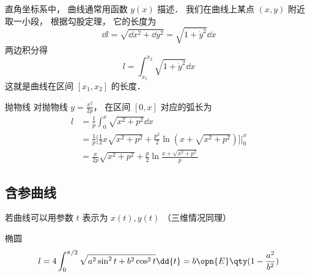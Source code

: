 

直角坐标系中， 曲线通常用函数 $y(x)$ 描述． 我们在曲线上某点 $(x, y)$ 附近取一小段， 根据勾股定理， 它的长度为
\begin{equation}
\dd{l} = \sqrt{\dd{x}^2 + \dd{y}^2} = \sqrt{1 + \dot y^2} \dd{x}
\end{equation}
两边积分得
\begin{equation}\label{CurLen_eq1}
l = \int_{x_1}^{x_2} \sqrt{1 + \dot y^2} \dd{x}
\end{equation}
这就是曲线在区间 $[x_1, x_2]$ 的长度．

\begin{example}{抛物线}
对抛物线 $y=\frac{x^2}{2p}$， 在区间 $[0,x]$ 对应的弧长为
\begin{equation}
\begin{aligned}
l& = \frac{1}{p}\int_{0}^{x}\sqrt{x^2+p^2}\dd{x}\\
&=\frac{1}{p}\bigg[\frac{1}{2}x\sqrt{x^2+p^2}+\frac{p^2}{2}\ln(x+\sqrt{x^2+p^2})\bigg]\Bigg\lvert_{0}^{x}\\
&=\frac{x}{2p}\sqrt{x^2+p^2}+\frac{p}{2}\ln\frac{x+\sqrt{x^2+p^2}}{p}
\end{aligned}
\end{equation}
\end{example}

\subsection{含参曲线}
若曲线可以用参数 $t$ 表示为 $x(t), y(t)$ （三维情况同理）
\begin{example}{椭圆}
\begin{equation}
l = 4\int_0^{\pi/2} \sqrt{a^2\sin^2 t + b^2 \cos^2 t} \dd{t} = b \opn{E}\qty(1 - \frac{a^2}{b^2})
\end{equation}
\end{example}
